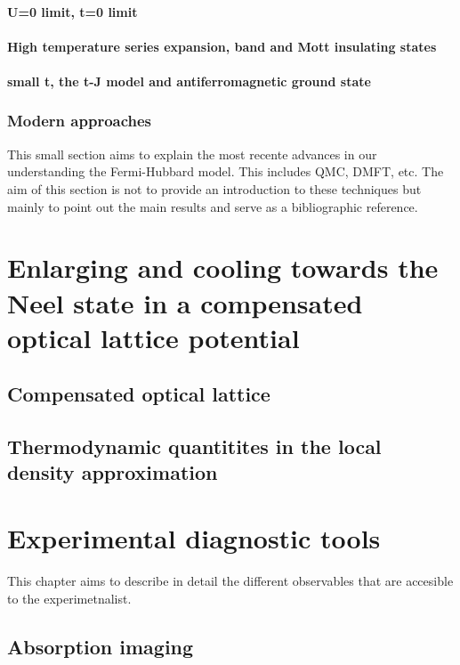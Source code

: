 \documentclass[oneside,11pt]{memoir}
\begin{document}
\subsubsection { U=0 limit, t=0 limit } 
\subsubsection { High temperature series expansion, band and Mott insulating states  }
\subsubsection { small t, the t-J model and antiferromagnetic ground state}

\subsection{Modern approaches}  

This small section aims to explain the most recente advances in our
understanding the Fermi-Hubbard model.  This includes QMC, DMFT, etc.  The aim
of this section is not to provide an introduction to these techniques but
mainly to point out the main results and serve as a bibliographic reference.  


\chapter{Enlarging and cooling towards the Neel state in a compensated optical
lattice potential}

\section{Compensated optical lattice} 
\section{Thermodynamic quantitites in the local density approximation} 


\chapter{Experimental diagnostic tools} 

This chapter aims to describe in detail the different observables that are
accesible to the experimetnalist.  

\section{Absorption imaging} 
\end{document}
